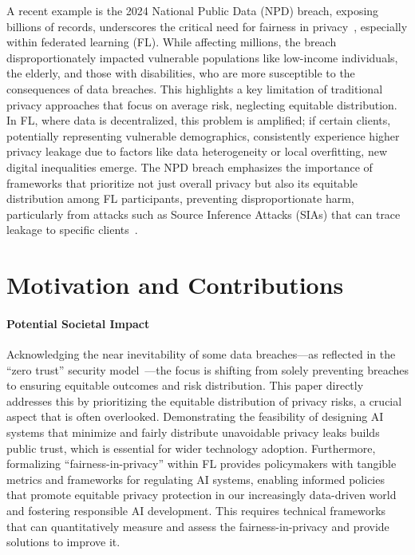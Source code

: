 A recent example is the 2024 National Public Data (NPD) breach, exposing billions of records, underscores the critical need for fairness in privacy~\cite{spectrumnews2024npdbreach}, especially within federated learning (FL). While affecting millions, the breach disproportionately impacted vulnerable populations like low-income individuals, the elderly, and those with disabilities, who are more susceptible to the consequences of data breaches. This highlights a key limitation of traditional privacy approaches that focus on average risk, neglecting equitable distribution. In FL, where data is decentralized, this problem is amplified; if certain clients, potentially representing vulnerable demographics, consistently experience higher privacy leakage due to factors like data heterogeneity or local overfitting, new digital inequalities emerge. The NPD breach emphasizes the importance of frameworks that prioritize not just overall privacy but also its equitable distribution among FL participants, preventing disproportionate harm, particularly from attacks such as Source Inference Attacks (SIAs) that can trace leakage to specific clients~\cite{BG_SIA_2}.


\section{Motivation and Contributions}


\paragraph{\textbf{Potential Societal Impact}} Acknowledging the near inevitability of some data breaches—as reflected in the ``zero trust'' security model~\cite{Rose2020Zero}—the focus is shifting from solely preventing breaches to ensuring equitable outcomes and risk distribution. This paper directly addresses this by prioritizing the equitable distribution of privacy risks, a crucial aspect that is often overlooked. Demonstrating the feasibility of designing AI systems that minimize and fairly distribute unavoidable privacy leaks builds public trust, which is essential for wider technology adoption. Furthermore, formalizing ``fairness-in-privacy'' within FL provides policymakers with tangible metrics and frameworks for regulating AI systems, enabling informed policies that promote equitable privacy protection in our increasingly data-driven world and fostering responsible AI development.
This requires technical frameworks that can quantitatively measure and assess the fairness-in-privacy and provide solutions to improve it.

